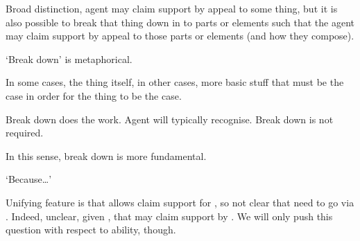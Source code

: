 \begin{note}
{  }


  Broad distinction, agent may claim support by appeal to some thing, but it is also possible to break that thing down in to parts or elements such that the agent may claim support by appeal to those parts or elements (and how they compose).

  `Break down' is metaphorical.

  In some cases, the thing itself, in other cases, more basic stuff that must be the case in order for the thing to be the case.

  Break down does the work.
  Agent will typically recognise.
  Break down is not required.

  In this sense, break down is more fundamental.
  

  `Because\dots'

  Unifying feature is that \adS{} allows claim support for \adC{}, so not clear that need to go via \adC{}.
  Indeed, unclear, given \ESU{}, that may claim support by \adC{}.
  We will only push this question with respect to ability, though.
\end{note}

\begin{note}
  
\end{note}

